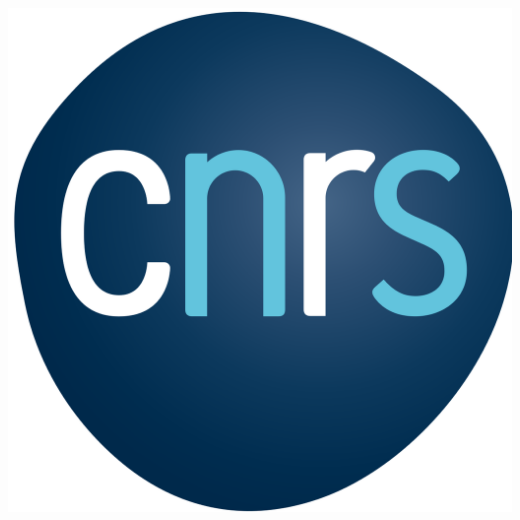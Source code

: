 \begin{task}
\begin{gridlayout}{\textwidth}{15cm}
\begin{row}{0.3}
\begin{cell}{0.5}
                \includegraphics[width=\cellwidth]{doc-two/img/logo-cnrs.png}
            \end{cell}
        \end{row}
    \end{gridlayout}
\logoguidesofdoctwo
\end{task}

\newpage
